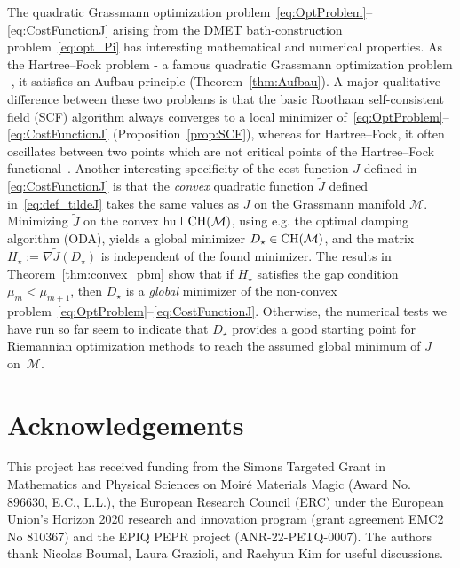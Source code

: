 \documentclass{article}
\newcommand{\1}{{\mathds 1}}
\begin{document}
The quadratic Grassmann optimization problem~\eqref{eq:OptProblem}--\eqref{eq:CostFunctionJ} arising from the DMET bath-construction problem~\eqref{eq:opt_Pi} has interesting mathematical and numerical properties. As the Hartree--Fock problem - a famous quadratic Grassmann optimization problem -, it satisfies an Aufbau principle (Theorem~\ref{thm:Aufbau}). A major qualitative difference between these two problems is that the basic Roothaan self-consistent field (SCF) algorithm always converges to a local minimizer of~\eqref{eq:OptProblem}--\eqref{eq:CostFunctionJ} (Proposition~\ref{prop:SCF}), whereas for Hartree--Fock, it often oscillates between two points which are not critical points of the Hartree--Fock functional~\cite{cances2000b}. Another interesting specificity of the cost function $J$ defined in  \eqref{eq:CostFunctionJ} is that the {\em convex} quadratic function $\widetilde J$ defined in~\eqref{eq:def_tildeJ} takes the same values as $J$ on the Grassmann manifold $\mathcal M$. Minimizing $\widetilde J$ on the convex hull ${\rm CH}(\mathcal M)$, using e.g. the optimal damping algorithm (ODA), yields a global minimizer $D_\star \in {\rm CH}(\mathcal M)$, and the matrix $H_\star := \nabla \widetilde J(D_\star)$ is independent of the found minimizer. The results in Theorem~\ref{thm:convex_pbm} show that if $H_\star$ satisfies the gap condition $\mu_m < \mu_{m+1}$, then $D_\star$ is a {\em global} minimizer of the non-convex problem~\eqref{eq:OptProblem}--\eqref{eq:CostFunctionJ}. Otherwise, the numerical tests we have run so far seem to indicate that $D_\star$ provides a good starting point for Riemannian optimization methods to reach the assumed global minimum of $J$ on~$\mathcal M$.


\section*{Acknowledgements} This project has received funding from the Simons Targeted Grant in Mathematics and Physical Sciences on Moir\'e Materials Magic (Award No. 896630, E.C., L.L.), the European Research Council (ERC) under the European Union's Horizon 2020 research and innovation program (grant agreement EMC2 No 810367) and the EPIQ PEPR project (ANR-22-PETQ-0007). The authors thank Nicolas Boumal, Laura Grazioli, and Raehyun Kim for useful discussions. 

\printbibliography
\end{document}
